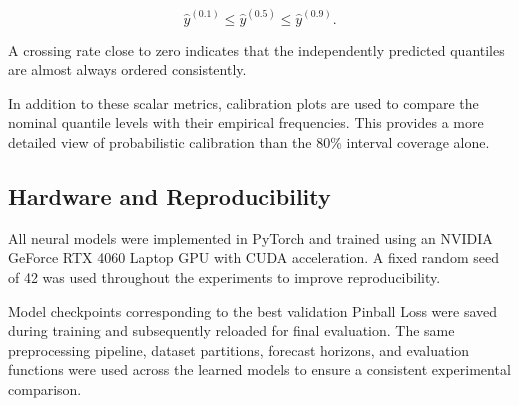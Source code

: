 \begin{equation}
    \hat{y}^{(0.1)}
    \leq
    \hat{y}^{(0.5)}
    \leq
    \hat{y}^{(0.9)}.
\end{equation}

A crossing rate close to zero indicates that the independently predicted
quantiles are almost always ordered consistently.

In addition to these scalar metrics, calibration plots are used to compare
the nominal quantile levels with their empirical frequencies. This provides
a more detailed view of probabilistic calibration than the 80\% interval
coverage alone.


\subsection{Hardware and Reproducibility}
\label{subsec:hardware}

All neural models were implemented in PyTorch and trained using an NVIDIA
GeForce RTX 4060 Laptop GPU with CUDA acceleration. A fixed random seed of
42 was used throughout the experiments to improve reproducibility.

Model checkpoints corresponding to the best validation Pinball Loss were
saved during training and subsequently reloaded for final evaluation. The
same preprocessing pipeline, dataset partitions, forecast horizons, and
evaluation functions were used across the learned models to ensure a
consistent experimental comparison.